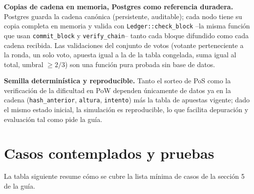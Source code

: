 \documentclass[11pt]{article}
\theoremstyle{remark}
\begin{document}
\textbf{Copias de cadena en memoria, Postgres como referencia duradera.} Postgres guarda la cadena canónica
(persistente, auditable); cada nodo tiene su copia completa en memoria y valida con \texttt{Ledger::check\_block} --la misma
función que usan \texttt{commit\_block} y \texttt{verify\_chain}-- tanto cada bloque difundido como cada cadena recibida.
Las validaciones del conjunto de votos (votante perteneciente a la ronda, un solo voto, apuesta igual a la de la tabla
congelada, suma igual al total, umbral $\ge 2/3$) son una función pura probada sin base de datos.

\textbf{Semilla determinística y reproducible.} Tanto el sorteo de PoS como la verificación de la dificultad en PoW
dependen únicamente de datos ya en la cadena (\texttt{hash\_anterior}, \texttt{altura}, \texttt{intento}) más la tabla de
apuestas vigente; dado el mismo estado inicial, la simulación es reproducible, lo que facilita depuración y evaluación tal
como pide la guía.

\section{Casos contemplados y pruebas}
La tabla siguiente resume cómo se cubre la lista mínima de casos de la sección 5 de la guía.
\end{document}
